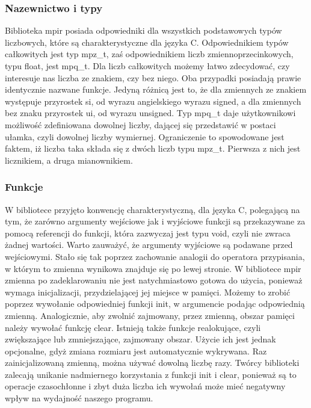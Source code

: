 \documentclass[twoside,a4paper]{book}
\begin{document}
\subsubsection{Nazewnictwo i typy}

Biblioteka mpir posiada odpowiedniki dla wszystkich podstawowych typów liczbowych, które są charakterystyczne dla języka C. Odpowiednikiem typów całkowitych jest typ mpz\_t, zaś odpowiednikiem liczb zmiennoprzecinkowych, typu float, jest mpq\_t. Dla liczb całkowitych możemy łatwo zdecydować, czy interesuje nas liczba ze znakiem, czy bez niego. Oba przypadki posiadają prawie identycznie nazwane funkcje. Jedyną różnicą jest to, że dla zmiennych ze znakiem występuje przyrostek si, od wyrazu angielskiego wyrazu signed, a dla zmiennych bez znaku przyrostek ui, od wyrazu unsigned. Typ mpq\_t daje użytkownikowi możliwość zdefiniowana dowolnej liczby, dającej się przedstawić w postaci ułamka, czyli dowolnej liczby wymiernej. Ograniczenie to spowodowane jest faktem, iż liczba taka składa się z dwóch liczb typu mpz\_t. Pierwsza z nich jest licznikiem, a druga mianownikiem.

\subsubsection{Funkcje}
W bibliotece przyjęto konwencję charakterystyczną, dla języka C, polegającą na tym, że zarówno argumenty wejściowe jak i wyjściowe funkcji są przekazywane za pomocą referencji do funkcji, która zazwyczaj jest typu void, czyli nie zwraca żadnej wartości. Warto zauważyć, że argumenty wyjściowe są podawane przed wejściowymi. Stało się tak poprzez zachowanie analogii do operatora przypisania, w którym to zmienna wynikowa znajduje się po lewej stronie.
W bibliotece mpir zmienna po zadeklarowaniu nie jest natychmiastowo gotowa do użycia, ponieważ wymaga inicjalizacji, przydzielającej jej miejsce w pamięci. Możemy to zrobić poprzez wywołanie odpowiedniej funkcji init, w argumencie podając odpowiednią zmienną. Analogicznie, aby zwolnić zajmowany, przez zmienną, obszar pamięci należy wywołać funkcję clear. Istnieją także funkcje realokujące, czyli zwiększające lub zmniejszające, zajmowany obszar. Użycie ich jest jednak opcjonalne, gdyż zmiana rozmiaru jest automatycznie wykrywana. Raz zainicjalizowaną zmienną, można używać dowolną liczbę razy. Twórcy biblioteki zalecają unikanie nadmiernego korzystania z funkcji init i clear, ponieważ są to operacje czasochłonne i zbyt duża liczba ich wywołań może mieć negatywny wpływ na wydajność naszego programu.
\end{document}
